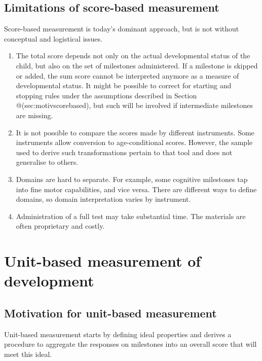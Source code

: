 \documentclass[
]{book}
\begin{document}
\hypertarget{limitations-of-score-based-measurement}{%
\subsection{Limitations of score-based measurement}\label{limitations-of-score-based-measurement}}

Score-based measurement is today's dominant approach, but is not without conceptual and logistical issues.

\begin{enumerate}
\def\labelenumi{\arabic{enumi}.}
\item
  The total score depends not only on the actual developmental status of the child, but also on the set of milestones administered. If a milestone is skipped or added, the sum score cannot be interpreted anymore as a measure of developmental status. It might be possible to correct for starting and stopping rules under the assumptions described in Section @(sec:motivscorebased), but such will be involved if intermediate milestones are missing.
\item
  It is not possible to compare the scores made by different instruments. Some instruments allow conversion to age-conditional scores. However, the sample used to derive such transformations pertain to that tool and does not generalise to others.
\item
  Domains are hard to separate. For example, some cognitive milestones tap into fine motor capabilities, and vice versa. There are different ways to define domains, so domain interpretation varies by instrument.
\item
  Administration of a full test may take substantial time. The materials are often proprietary and costly.
\end{enumerate}

\hypertarget{sec:unitbased}{%
\section{Unit-based measurement of development}\label{sec:unitbased}}

\hypertarget{sec:motivationunit}{%
\subsection{Motivation for unit-based measurement}\label{sec:motivationunit}}

Unit-based measurement starts by defining ideal properties and derives a procedure to aggregate the responses on milestones into an overall score that will meet this ideal.
\end{document}
